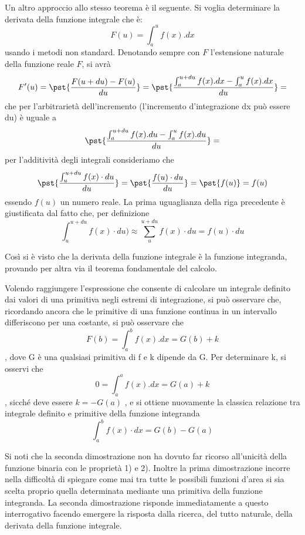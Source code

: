 Un altro approccio allo stesso teorema è il seguente.
Si voglia determinare la derivata della funzione integrale che è: 
\[F(u) = \int_a^u f(x).dx\]
usando i metodi non standard. Denotando sempre con \(F\) l’estensione naturale 
della funzione reale \(F\), si avrà
\[F'(u) = \pst{\frac{F(u+du)-F(u)}{du}} = 
\pst{\frac{\int_a^{u+du} f(x).dx - \int_a^u f(x).dx}{du}} =\] 
che per l'arbitrarietà dell'incremento (l'incremento d'integrazione dx può 
essere du) è uguale a
\[\pst{\frac{\int_a^{u+du} f(x).du - \int_a^u f(x).du}{du}} =\]
per l'additività degli integrali consideriamo che
\[\pst{\frac{\int_u^{u+du} f(x) \cdot du}{du}} = 
    \pst{\frac{f(u) \cdot du}{du}} = \pst{f(u)} = f(u)\]
essendo \(f(u)\) un numero reale. La prima uguaglianza della riga
precedente è giustificata dal fatto che, per definizione 
\[\int_u^{u+du} f(x) \cdot du) \approx \sum_u^{u+du} f(x) \cdot du = 
  f(u) \cdot du\]

 Così si è visto che la derivata della funzione integrale è la funzione 
integranda, provando per altra via il teorema fondamentale del calcolo.

Volendo raggiungere l'espressione che consente di calcolare un integrale 
definito dai valori di una primitiva negli estremi di integrazione, si può 
osservare che, ricordando ancora che le primitive di una funzione continua in 
un intervallo differiscono per una costante, si può osservare che
\[F(b) = \int_a^b f(x) .dx = G(b) + k\],
dove G è una qualsiasi primitiva di f e k dipende da G. Per determinare k, si 
osservi che
\[0 = \int_a^a f(x).dx = G(a) + k\],
sicché deve essere \(k = - G(a)\) , e si ottiene nuovamente la classica 
relazione 
tra integrale definito e primitive della funzione integranda 
\[\int_a^b f(x) \cdot dx = G(b) - G(a)\]

 Si noti che la seconda dimostrazione non ha dovuto far ricorso all'unicità 
della funzione binaria con le proprietà 1) e 2). Inoltre la prima 
dimostrazione incorre nella difficoltà di spiegare come mai tra tutte le 
possibili funzioni d'area si sia scelta proprio quella determinata mediante 
una primitiva della funzione integranda. La seconda dimostrazione risponde 
immediatamente a questo interrogativo facendo emergere la risposta dalla 
ricerca, del tutto naturale, della derivata della funzione integrale.

